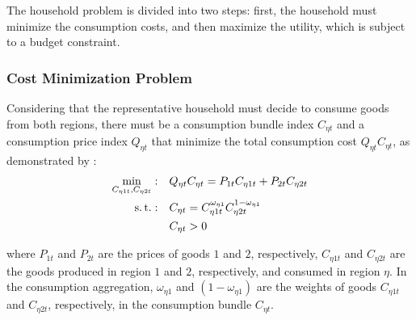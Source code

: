 \documentclass[../thesis.tex]{subfiles}
\begin{document}

The household problem is divided into two steps: first, the household must minimize the consumption costs, and then maximize the utility, which is subject to a budget constraint.

\subsubsection*{Cost Minimization Problem}

Considering that the representative household must decide to consume goods from both regions, there must be a consumption bundle index $C_{\eta t}$ and a consumption price index $Q_{\eta t}$ that minimize the total consumption cost $Q_{\eta t} C_{\eta t}$, as demonstrated by \textcite[p.424]{walsh_monetary_2017}:
	\begin{align}
		\min_{C_{\eta 1 t}, C_{\eta 2 t}}: &\quad Q_{\eta t} C_{\eta t} = P_{1 t} C_{\eta 1t} + P_{2 t} C_{\eta 2t} \label{eq_v2:reg-consumption-cost}
		\\
		\operatorname{s.t.}: &\quad C_{\eta t} = C_{\eta 1 t}^{\omega_{\eta 1}} C_{\eta 2 t}^{1-\omega_{\eta 1}} \label{eq_v2:reg-consumption-aggregation} \\
		&\quad C_{\eta t} > 0 \nonumber
	\end{align}

	where $P_{1t}$ and $P_{2t}$ are the prices of goods $1$ and $2$, respectively, $C_{\eta 1 t}$ and $C_{\eta 2 t}$ are the goods produced in region $1$ and $2$, respectively, and consumed in region $\eta$. In the consumption aggregation, ${\omega_{\eta 1}}$ and $({1 - \omega_{\eta 1}})$ are the weights of goods $C_{\eta 1 t}$ and $C_{\eta 2 t}$, respectively, in the consumption bundle $C_{\eta t}$.
\end{document}
